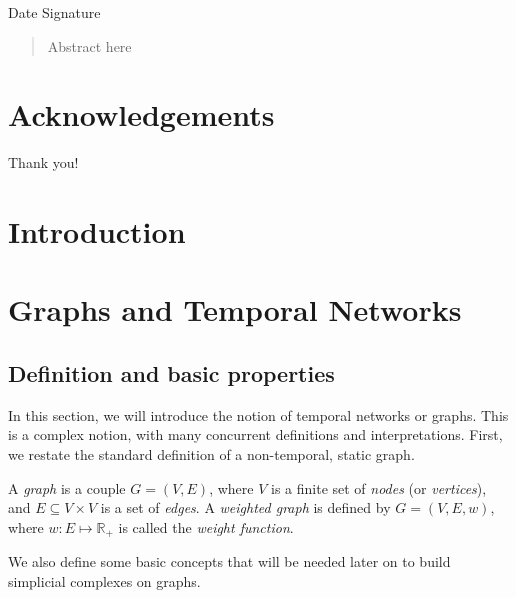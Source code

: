 \documentclass[a4paper,11pt,openany,extrafontsizes]{memoir}
\begin{document}
\begin{center}
  Date \hspace{.5\linewidth} Signature
\end{center}


\cleardoublepage%

\begin{abstract}
  Abstract here
\end{abstract}

\cleardoublepage%

\chapter*{Acknowledgements}%
\label{cha:acknowledgements}

Thank you!

\cleardoublepage%

\tableofcontents*
\listoffigures*
\listoftables*

\clearpage

\mainmatter%

\chapter{Introduction}%
\label{cha:introduction}


\chapter{Graphs and Temporal Networks}%
\label{cha:temporal-networks}

\section{Definition and basic properties}%
\label{sec:defin-basic-prop}

In this section, we will introduce the notion of temporal networks or
graphs. This is a complex notion, with many concurrent definitions and
interpretations. First, we restate the standard definition of a
non-temporal, static graph.

\begin{defn}[Graph]
  A \emph{graph} is a couple $G = (V, E)$, where $V$ is a finite set
  of \emph{nodes} (or \emph{vertices}), and $E \subseteq V\times V$ is
  a set of \emph{edges}. A \emph{weighted graph} is defined by
  $G = (V, E, w)$, where $w : E\mapsto \mathbb{R}_+$ is called the
  \emph{weight function}.
\end{defn}

We also define some basic concepts that will be needed later on to
build simplicial complexes on graphs.
\end{document}
